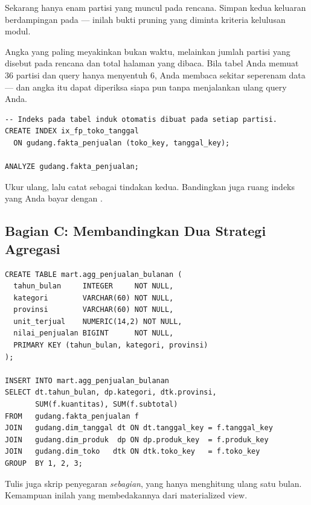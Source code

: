 Sekarang hanya enam partisi yang muncul pada rencana. Simpan kedua keluaran
 berdampingan pada  --- inilah
bukti pruning yang diminta kriteria kelulusan modul.

\begin{catatan}
Angka yang paling meyakinkan bukan waktu, melainkan jumlah partisi yang
disebut pada rencana dan total halaman yang dibaca. Bila tabel Anda memuat 36
partisi dan query hanya menyentuh 6, Anda membaca sekitar seperenam data ---
dan angka itu dapat diperiksa siapa pun tanpa menjalankan ulang query Anda.
\end{catatan}


\begin{lstlisting}[style=sqlgaya]
-- Indeks pada tabel induk otomatis dibuat pada setiap partisi.
CREATE INDEX ix_fp_toko_tanggal
  ON gudang.fakta_penjualan (toko_key, tanggal_key);

ANALYZE gudang.fakta_penjualan;
\end{lstlisting}

Ukur ulang, lalu catat sebagai tindakan kedua. Bandingkan juga ruang indeks
yang Anda bayar dengan .

\subsection{Bagian C: Membandingkan Dua Strategi Agregasi}


\begin{lstlisting}[style=sqlgaya]
CREATE TABLE mart.agg_penjualan_bulanan (
  tahun_bulan     INTEGER     NOT NULL,
  kategori        VARCHAR(60) NOT NULL,
  provinsi        VARCHAR(60) NOT NULL,
  unit_terjual    NUMERIC(14,2) NOT NULL,
  nilai_penjualan BIGINT      NOT NULL,
  PRIMARY KEY (tahun_bulan, kategori, provinsi)
);

INSERT INTO mart.agg_penjualan_bulanan
SELECT dt.tahun_bulan, dp.kategori, dtk.provinsi,
       SUM(f.kuantitas), SUM(f.subtotal)
FROM   gudang.fakta_penjualan f
JOIN   gudang.dim_tanggal dt ON dt.tanggal_key = f.tanggal_key
JOIN   gudang.dim_produk  dp ON dp.produk_key  = f.produk_key
JOIN   gudang.dim_toko   dtk ON dtk.toko_key   = f.toko_key
GROUP  BY 1, 2, 3;
\end{lstlisting}

Tulis juga skrip penyegaran \emph{sebagian}, yang hanya menghitung ulang satu
bulan. Kemampuan inilah yang membedakannya dari materialized view.

